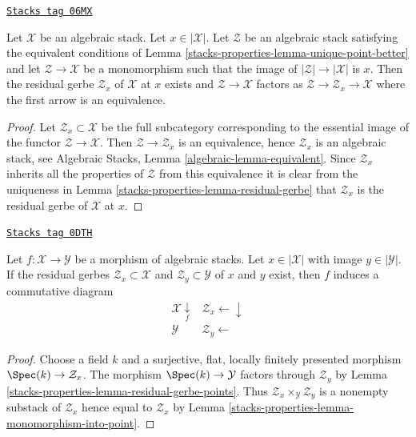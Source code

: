 \begin{lemma}
\label{stacks-properties-lemma-residual-gerbe-unique}
\href{https://stacks.math.columbia.edu/tag/06MX}{\texttt{Stacks tag 06MX}}

Let $\mathcal{X}$ be an algebraic stack. Let $x \in |\mathcal{X}|$.
Let $\mathcal{Z}$ be an algebraic stack satisfying the equivalent conditions of
Lemma \ref{stacks-properties-lemma-unique-point-better}
and let $\mathcal{Z} \to \mathcal{X}$ be a monomorphism such that the image
of $|\mathcal{Z}| \to |\mathcal{X}|$ is $x$. Then the residual gerbe
$\mathcal{Z}_x$ of $\mathcal{X}$ at $x$ exists and
$\mathcal{Z} \to \mathcal{X}$ factors as
$\mathcal{Z} \to \mathcal{Z}_x \to \mathcal{X}$ where the first arrow
is an equivalence.
\end{lemma}

\begin{proof}
Let $\mathcal{Z}_x \subset \mathcal{X}$ be the full subcategory corresponding
to the essential image of the functor $\mathcal{Z} \to \mathcal{X}$.
Then $\mathcal{Z} \to \mathcal{Z}_x$ is an equivalence, hence
$\mathcal{Z}_x$ is an algebraic stack, see
Algebraic Stacks, Lemma \ref{algebraic-lemma-equivalent}.
Since $\mathcal{Z}_x$ inherits all the properties of $\mathcal{Z}$ from
this equivalence it is clear from the uniqueness in
Lemma \ref{stacks-properties-lemma-residual-gerbe}
that $\mathcal{Z}_x$ is the residual gerbe of $\mathcal{X}$ at $x$.
\end{proof}

\begin{lemma}
\label{stacks-properties-lemma-residual-gerbe-functorial}
\href{https://stacks.math.columbia.edu/tag/0DTH}{\texttt{Stacks tag 0DTH}}

Let $f : \mathcal{X} \to \mathcal{Y}$ be a morphism of algebraic stacks.
Let $x \in |\mathcal{X}|$ with image $y \in |\mathcal{Y}|$.
If the residual gerbes $\mathcal{Z}_x \subset \mathcal{X}$
and $\mathcal{Z}_y \subset \mathcal{Y}$ of $x$ and $y$ exist,
then $f$ induces a commutative diagram
$$
\begin{array}{cc}\mathcal{X} \underset{f}{\downarrow} & \mathcal{Z}_x \longleftarrow\downarrow \\ \mathcal{Y} & \mathcal{Z}_y \longleftarrow\end{array}
$$
\end{lemma}

\begin{proof}
Choose a field $k$ and a surjective, flat, locally finitely presented
morphism $\Spec(k) \to \mathcal{Z}_x$. The morphism
$\Spec(k) \to \mathcal{Y}$ factors through $\mathcal{Z}_y$ by
Lemma \ref{stacks-properties-lemma-residual-gerbe-points}.
Thus $\mathcal{Z}_x \times_\mathcal{Y} \mathcal{Z}_y$
is a nonempty substack of $\mathcal{Z}_x$
hence equal to $\mathcal{Z}_x$ by Lemma \ref{stacks-properties-lemma-monomorphism-into-point}.
\end{proof}

